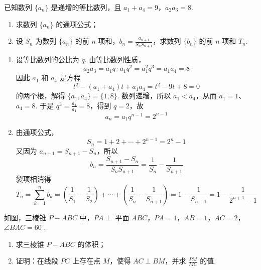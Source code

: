 \begin{problem}
已知数列 \(\{a_{n}\}\) 是递增的等比数列，且 \(a_{1} + a_{4} = 9\)，\(a_{2}a_{3} = 8\).
\begin{enumerate}
\item 求数列 \( \{a_{n}\} \) 的通项公式；
\item 设 \(S_{n}\) 为数列 \(\{a_{n}\}\) 的前 \(n\) 项和，\(b_{n} = \frac{a_{n+1}}{S_{n} S_{n+1}}\)，求数列 \(\{b_{n}\}\) 的前 \(n\) 项和 \(T_{n}\).
\end{enumerate}
\end{problem}

\begin{solution}
\begin{enumerate}
\item 设等比数列的公比为 \(q\). 由等比数列性质，
\[
a_2a_3=a_1q\cdot a_1q^2=a_1^2q^3=a_1a_4=8
\]
因此 \(a_1\) 和 \(a_4\) 是方程
\[
t^2-(a_1+a_4)t+a_1a_4=t^2-9t+8=0
\]
的两个根，解得 \(\{a_1,a_4\}=\{1,8\}\). 数列递增，所以 \(a_1<a_4\)，从而 \(a_1=1\)、\(a_4=8\). 于是 \(q^3=\frac{a_4}{a_1}=8\)，得到 \(q=2\)，故
\[
a_n=a_1q^{n-1}=2^{n-1}
\]
\item 由通项公式，
\[
S_n=1+2+\cdots+2^{n-1}=2^n-1
\]
又因为 \(a_{n+1}=S_{n+1}-S_n\)，所以
\[
b_n=\frac{S_{n+1}-S_n}{S_nS_{n+1}}=\frac1{S_n}-\frac1{S_{n+1}}
\]
裂项相消得
\[
T_n=\sum_{k=1}^n b_k
=\left(\frac1{S_1}-\frac1{S_2}\right)+\cdots+\left(\frac1{S_n}-\frac1{S_{n+1}}\right)
=1-\frac1{S_{n+1}}
=1-\frac1{2^{n+1}-1}
\]
\end{enumerate}
\end{solution}

\begin{problem}
如图，三棱锥 \(P-ABC\) 中，\(PA \perp\) 平面 \(ABC\)，\(PA = 1\)，\(AB = 1\)，\(AC = 2\)，\(\angle BAC = 60^\circ\).
\begin{enumerate}
\item 求三棱锥 \(P-ABC\) 的体积；
\item 证明：在线段 \(PC\) 上存在点 \(M\)，使得 \(AC \perp BM\)，并求 \(\frac{PM}{MC}\) 的值.
\end{enumerate}

\end{problem}

\FloatBarrier


